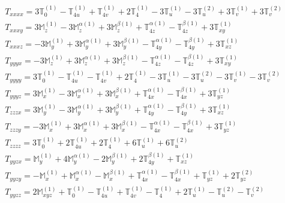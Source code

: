 \documentclass[fleqn,8pt,landscape]{jsarticle}
\begin{document}
\begin{align*}
& T_{xxxx} = 3 \mathbb{T}_{0}^{(1)} - \mathbb{T}_{4u}^{(1)} + \mathbb{T}_{4v}^{(1)} + 2 \mathbb{T}_{4}^{(1)} - 3 \mathbb{T}_{u}^{(1)} - 3 \mathbb{T}_{u}^{(2)} + 3 \mathbb{T}_{v}^{(1)} + 3 \mathbb{T}_{v}^{(2)} \\
& T_{xxxy} = 3 \mathbb{M}_{z}^{(1)} - 3 \mathbb{M}_{z}^{\alpha(1)} + 3 \mathbb{M}_{z}^{\beta(1)} + \mathbb{T}_{4z}^{\alpha(1)} - \mathbb{T}_{4z}^{\beta(1)} + 3 \mathbb{T}_{xy}^{(1)} \\
& T_{xxxz} = - 3 \mathbb{M}_{y}^{(1)} + 3 \mathbb{M}_{y}^{\alpha(1)} + 3 \mathbb{M}_{y}^{\beta(1)} - \mathbb{T}_{4y}^{\alpha(1)} - \mathbb{T}_{4y}^{\beta(1)} + 3 \mathbb{T}_{xz}^{(1)} \\
& T_{yyyx} = - 3 \mathbb{M}_{z}^{(1)} + 3 \mathbb{M}_{z}^{\alpha(1)} + 3 \mathbb{M}_{z}^{\beta(1)} - \mathbb{T}_{4z}^{\alpha(1)} - \mathbb{T}_{4z}^{\beta(1)} + 3 \mathbb{T}_{xy}^{(1)} \\
& T_{yyyy} = 3 \mathbb{T}_{0}^{(1)} - \mathbb{T}_{4u}^{(1)} - \mathbb{T}_{4v}^{(1)} + 2 \mathbb{T}_{4}^{(1)} - 3 \mathbb{T}_{u}^{(1)} - 3 \mathbb{T}_{u}^{(2)} - 3 \mathbb{T}_{v}^{(1)} - 3 \mathbb{T}_{v}^{(2)} \\
& T_{yyyz} = 3 \mathbb{M}_{x}^{(1)} - 3 \mathbb{M}_{x}^{\alpha(1)} + 3 \mathbb{M}_{x}^{\beta(1)} + \mathbb{T}_{4x}^{\alpha(1)} - \mathbb{T}_{4x}^{\beta(1)} + 3 \mathbb{T}_{yz}^{(1)} \\
& T_{zzzx} = 3 \mathbb{M}_{y}^{(1)} - 3 \mathbb{M}_{y}^{\alpha(1)} + 3 \mathbb{M}_{y}^{\beta(1)} + \mathbb{T}_{4y}^{\alpha(1)} - \mathbb{T}_{4y}^{\beta(1)} + 3 \mathbb{T}_{xz}^{(1)} \\
& T_{zzzy} = - 3 \mathbb{M}_{x}^{(1)} + 3 \mathbb{M}_{x}^{\alpha(1)} + 3 \mathbb{M}_{x}^{\beta(1)} - \mathbb{T}_{4x}^{\alpha(1)} - \mathbb{T}_{4x}^{\beta(1)} + 3 \mathbb{T}_{yz}^{(1)} \\
& T_{zzzz} = 3 \mathbb{T}_{0}^{(1)} + 2 \mathbb{T}_{4u}^{(1)} + 2 \mathbb{T}_{4}^{(1)} + 6 \mathbb{T}_{u}^{(1)} + 6 \mathbb{T}_{u}^{(2)} \\
& T_{yyzx} = \mathbb{M}_{y}^{(1)} + 4 \mathbb{M}_{y}^{\alpha(1)} - 2 \mathbb{M}_{y}^{\beta(1)} + 2 \mathbb{T}_{4y}^{\beta(1)} + \mathbb{T}_{xz}^{(1)} \\
& T_{yyzy} = - \mathbb{M}_{x}^{(1)} + \mathbb{M}_{x}^{\alpha(1)} - \mathbb{M}_{x}^{\beta(1)} + \mathbb{T}_{4x}^{\alpha(1)} - \mathbb{T}_{4x}^{\beta(1)} + \mathbb{T}_{yz}^{(1)} + 2 \mathbb{T}_{yz}^{(2)} \\
& T_{yyzz} = 2 \mathbb{M}_{xyz}^{(1)} + \mathbb{T}_{0}^{(1)} - \mathbb{T}_{4u}^{(1)} + \mathbb{T}_{4v}^{(1)} - \mathbb{T}_{4}^{(1)} + 2 \mathbb{T}_{u}^{(1)} - \mathbb{T}_{u}^{(2)} - \mathbb{T}_{v}^{(2)} \\

\end{align*}
\end{document}
